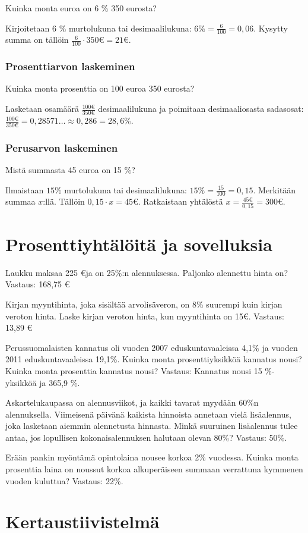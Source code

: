 Kuinka monta euroa on 6 $\%$ 350 eurosta?

Kirjoitetaan 6 $\%$ murtolukuna tai desimaalilukuna: $6 \% = \frac{6}{100} = 0,06$. Kysytty summa on tällöin $\frac{6}{100} \cdot 350 \euro = 21 \euro$.

\subsection{Prosenttiarvon laskeminen}

Kuinka monta prosenttia on 100 euroa 350 eurosta?

Lasketaan osamäärä $\frac{100 \euro}{350 \euro}$ desimaalilukuna ja poimitaan desimaaliosasta sadasosat: $\frac{100 \euro}{350 \euro} = 0,28571 \ldots \approx 0,286 = 28,6 \%$.

\subsection{Perusarvon laskeminen}

Mistä summasta 45 euroa on 15 $\%$?

Ilmaistaan $15 \%$ murtolukuna tai desimaalilukuna: $15 \% = \frac{15}{100} = 0,15$. Merkitään summaa $x$:llä. Tällöin $0,15 \cdot x = 45 \euro$. Ratkaistaan yhtälöstä $x = \frac{45 \euro}{0,15} = 300 \euro$.

\chapter{Prosenttiyhtälöitä ja sovelluksia}

Laukku maksaa 225 \euro ja on 25\%:n alennuksessa. Paljonko alennettu hinta on?
Vastaus: 168,75 \euro

Kirjan myyntihinta, joka sisältää arvolisäveron, on 8\% suurempi kuin kirjan veroton hinta. Laske kirjan veroton hinta, kun myyntihinta on 15\euro.
Vastaus: 13,89 \euro

Perussuomalaisten kannatus oli vuoden 2007 eduskuntavaaleissa 4,1\% ja vuoden 2011 eduskuntavaaleissa 19,1\%. Kuinka monta prosenttiyksikköä kannatus nousi? Kuinka monta prosenttia kannatus nousi?
Vastaus: Kannatus nousi 15 \%-yksikköä ja 365,9 \%.

Askartelukaupassa on alennusviikot, ja kaikki tavarat myydään 60\%n alennuksella. Viimeisenä päivänä kaikista hinnoista annetaan vielä lisäalennus, joka lasketaan aiemmin alennetusta hinnasta. Minkä suuruinen lisäalennus tulee antaa, jos lopullisen kokonaisalennuksen halutaan olevan 80\%?
Vastaus: 50\%.

Erään pankin myöntämä opintolaina nousee korkoa 2\% vuodessa. Kuinka monta prosenttia laina on noussut korkoa alkuperäiseen summaan verrattuna kymmenen vuoden kuluttua?
Vastaus: 22\%.

%
%
\chapter{Kertaustiivistelmä}

